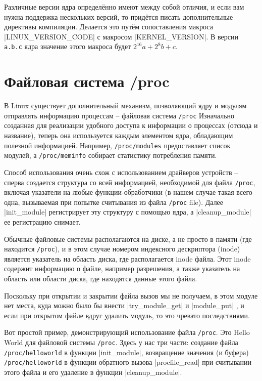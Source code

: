 \documentclass[10pt, oneside]{book}
\begin{document}
Различные версии ядра определённо имеют между собой отличия, и если вам нужна поддержка нескольких версий, то придётся писать дополнительные директивы
компиляции. Делается это путём сопоставления макроса \cpp|LINUX_VERSION_CODE| с макросом \cpp|KERNEL_VERSION|.
В версии \verb|a.b.c| ядра значение этого макроса будет \(2^{16}a+2^{8}b+c\).

\section{Файловая система /proc}
\label{sec:procfs}
В Linux существует дополнительный механизм, позволяющий ядру и модулям отправлять информацию процессам – файловая система \verb|/proc| Изначально созданная для реализации удобного доступа к информации о процессах (отсюда и название), теперь она используется каждым элементом ядра, обладающим полезной информацией. Например, \verb|/proc/modules| предоставляет список модулей, а \verb|/proc/meminfo| собирает статистику потребления памяти.

Способ использования очень схож с использованием драйверов устройств – сперва создается структура со всей информацией, необходимой для файла \verb|/proc|, включая указатели на любые функции-обработчики (в нашем случае такая всего одна,
вызываемая при попытке считывания из файла \verb|/proc| file).
Далее \cpp|init_module| регистрирует эту структуру с помощью ядра, а \cpp|cleanup_module| ее регистрацию снимает.

Обычные файловые системы располагаются на диске, а не просто в памяти (где
находится \verb|/proc|), и в этом случае номером индексного дескриптора (inode) является указатель на область диска, где располагается inode файла. Этот inode содержит информацию о файле, например разрешения, а также указатель на область или области диска, где находятся данные этого файла.

Поскольку при открытии и закрытии файла вызов мы не получаем, в этом модуле нет места, куда можно было бы внести \cpp|try_module_get| и \cpp|module_put| , и если при открытом файле вдруг удалить модуль, то это чревато последствиями.

Вот простой пример, демонстрирующий использование файла \verb|/proc|.
Это Hello World для файловой системы \verb|/proc|.
Здесь у нас три части: создание файла \verb|/proc/helloworld| в функции \cpp|init_module|, возвращение значения (и буфера) \verb|/proc/helloworld| в функции обратного вызова \cpp|procfile_read| при считывании этого файла и его удаление в функции \cpp|cleanup_module|.
\end{document}
